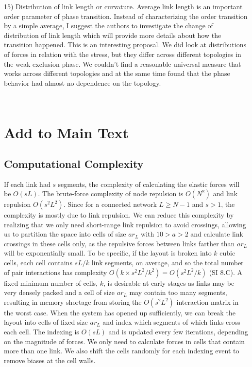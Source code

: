 \documentclass[11pt]{article}
\begin{document}
\begin{response}{
15) Distribution of link length or curvature. Average link length is an important order parameter of phase transition. Instead of characterizing the order transition by a simple average, I suggest the authors to investigate the change of distribution of link length which will provide more details about how the transition happened.
}
This is an interesting proposal. 
We did look at distributions of forces in relation with the stress, but they differ across different topologies in the weak exclusion phase.
We couldn't find a reasonable universal measure that works across different topologies and at the same time found that the phase behavior had almost no dependence on the topology. 

\end{response}

~\newpage
~\newpage

\section{Add to Main Text}

\subsection{Computational Complexity}
If each link had $s$ segments, the  complexity of calculating the elastic forces will be $O(sL)$.
The brute-force complexity of node repulsion is $O(N^2)$ and link repulsion $O(s^2L^2)$.
Since for a connected network $L\geq N-1$ and $s>1$, the complexity is mostly due to link repulsion. 
We can reduce this complexity by realizing that we only need short-range link repulsion to avoid crossings, allowing us to partition the space into cells of size $ar_L$ with $10>a>2$ and calculate link crossings in these cells only, as the repulsive forces between links farther than $ar_L$ will be exponentially small.
To be specific, if the layout is broken into $k$ cubic cells, each cell contains $sL/k$ link segments, on average, and so the total number of pair interactions has complexity
$O(k\times s^2L^2/k^2 ) = O(s^2L^2/k)$ (SI 8.C). 
A fixed minimum number of cells, $k$, is desirable at early stages as links may be very densely packed and a cell of size $ar_L$ may contain too many segments, resulting in memory shortage from storing the $O(s^2L^2)$ interaction matrix in the worst case. 
When the system has opened up sufficiently, we can break the layout into cells of fixed size $ar_L$ and index which segments of which links cross each cell. 
The indexing is $O(sL)$ and is updated every few iterations, depending on the magnitude of forces.
We only need to calculate forces in cells that contain more than one link.
We also shift the cells randomly for each indexing event to remove biases at the cell walls. 
\end{document}

